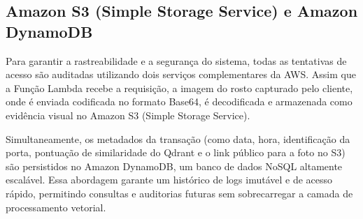 \subsection{Amazon S3 (Simple Storage Service) e Amazon DynamoDB}
Para garantir a rastreabilidade e a segurança do sistema, todas as tentativas de acesso 
são auditadas utilizando dois serviços complementares da AWS. Assim que a Função Lambda 
recebe a requisição, a imagem do rosto capturado pelo cliente, onde é enviada codificada
no formato Base64, é decodificada e armazenada como evidência visual no Amazon S3 
(Simple Storage Service).

Simultaneamente, os metadados da transação (como data, hora, identificação da porta, 
pontuação de similaridade do Qdrant e o link público para a foto no S3) são persistidos 
no Amazon DynamoDB, um banco de dados NoSQL altamente escalável. Essa abordagem garante 
um histórico de logs imutável e de acesso rápido, permitindo consultas e auditorias 
futuras sem sobrecarregar a camada de processamento vetorial.
